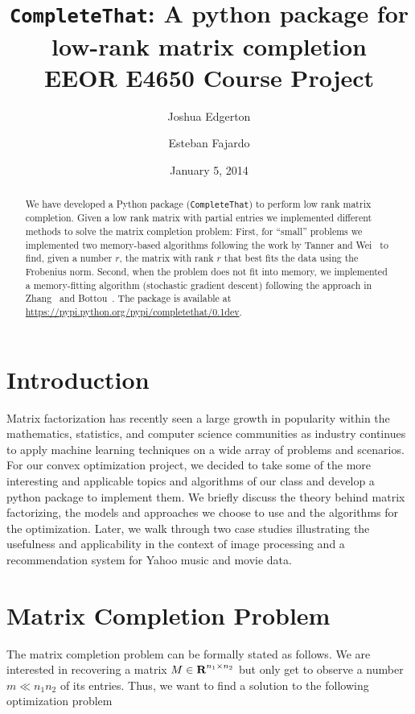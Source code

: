 \documentclass[12pt]{article}
\title{\texttt{CompleteThat}: A python package for  low-rank matrix completion\\EEOR E4650 Course Project
}
\author{Joshua Edgerton \and Esteban Fajardo}
\date{January 5, 2014}
\begin{document}
\maketitle

\begin{abstract}
We have developed a Python package (\texttt{CompleteThat}) to perform low rank matrix completion. Given a low rank matrix with partial entries we implemented different methods to solve the matrix completion problem:  First, for ``small'' problems we implemented two memory-based algorithms  following the work by Tanner and Wei~\cite{Tanner:2014} to find, given a number $r$, the matrix with rank $r$ that best fits the data using the Frobenius norm. Second, when the problem does not fit into memory, we implemented a memory-fitting algorithm (stochastic gradient descent) following the approach in Zhang~\cite{zhang:2004} and Bottou~\cite{bottou:2012}. The package is available at \url{https://pypi.python.org/pypi/completethat/0.1dev}. 
\end{abstract}

\newpage
\tableofcontents
\newpage

\section{Introduction}
Matrix factorization has recently seen a large growth in popularity within the mathematics, statistics, and computer science communities as industry continues to apply machine learning techniques on a wide array of problems and scenarios. For our convex optimization project, we decided to take some of the more interesting and applicable topics and algorithms of our class and develop a python package to implement them. We briefly discuss the theory behind matrix factorizing, the models and approaches we choose to use and the algorithms for the optimization. Later, we walk through two case studies illustrating the usefulness and applicability in the context of image processing and a recommendation system for Yahoo music and movie data. 

\section{Matrix Completion Problem}
The matrix completion problem can be formally stated as follows. We are interested in recovering a matrix $M \in {\mbox{\bf R}}^{n_1 \times n_2}$ but only get to observe a number $m \ll n_1n_2$ of its entries. Thus, we want to find a solution to the following optimization problem
\end{document}
